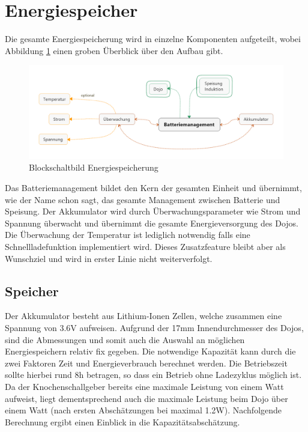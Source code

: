 \section{Energiespeicher}

Die gesamte Energiespeicherung wird in einzelne Komponenten aufgeteilt, wobei Abbildung \ref{fig:blockschaltbild} einen groben Überblick über den Aufbau gibt.

\begin{figure}[H]
	\begin{center}
		\includegraphics[width=160mm]{data/Batteriemanagement.png}
		\caption{Blockschaltbild Energiespeicherung} %
		\label{fig:blockschaltbild}
	\end{center}
\end{figure}

Das Batteriemanagement bildet den Kern der gesamten Einheit und übernimmt, wie der Name schon sagt, das gesamte Management zwischen Batterie und Speisung. Der Akkumulator wird durch Überwachungsparameter wie Strom und Spannung überwacht und übernimmt die gesamte Energieversorgung des Dojos. Die Überwachung der Temperatur ist lediglich notwendig falls eine Schnellladefunktion implementiert wird. Dieses Zusatzfeature bleibt aber als Wunschziel und wird in erster Linie nicht weiterverfolgt.

\subsection{Speicher}
Der Akkumulator besteht aus Lithium-Ionen Zellen, welche zusammen eine Spannung von 3.6V aufweisen. Aufgrund der 17mm Innendurchmesser des Dojos, sind die Abmessungen und somit auch die Auswahl an möglichen Energiespeichern relativ fix gegeben. Die notwendige Kapazität kann durch die zwei Faktoren Zeit und Energieverbrauch berechnet werden. Die Betriebszeit sollte hierbei rund 8h betragen, so dass ein Betrieb ohne Ladezyklus möglich ist. Da der Knochenschallgeber bereits eine maximale Leistung von einem Watt aufweist, liegt dementsprechend auch die maximale Leistung beim Dojo über einem Watt (nach ersten Abschätzungen bei maximal 1.2W). Nachfolgende Berechnung ergibt einen Einblick in die Kapazitätsabschätzung.

